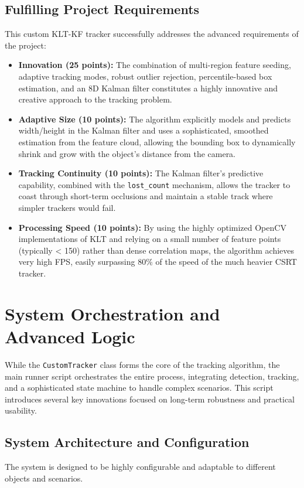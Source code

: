 \documentclass[12pt, a4paper]{article}
\begin{document}
\subsection{Fulfilling Project Requirements}
This custom KLT-KF tracker successfully addresses the advanced requirements of the project:
\begin{itemize}
    \item \textbf{Innovation (25 points):} The combination of multi-region feature seeding, adaptive tracking modes, robust outlier rejection, percentile-based box estimation, and an 8D Kalman filter constitutes a highly innovative and creative approach to the tracking problem.
    \item \textbf{Adaptive Size (10 points):} The algorithm explicitly models and predicts width/height in the Kalman filter and uses a sophisticated, smoothed estimation from the feature cloud, allowing the bounding box to dynamically shrink and grow with the object's distance from the camera.
    \item \textbf{Tracking Continuity (10 points):} The Kalman filter's predictive capability, combined with the \texttt{lost\_count} mechanism, allows the tracker to coast through short-term occlusions and maintain a stable track where simpler trackers would fail.
    \item \textbf{Processing Speed (10 points):} By using the highly optimized OpenCV implementations of KLT and relying on a small number of feature points (typically < 150) rather than dense correlation maps, the algorithm achieves very high FPS, easily surpassing 80\% of the speed of the much heavier CSRT tracker.
\end{itemize}

\section{System Orchestration and Advanced Logic}
While the \lstinline!CustomTracker! class forms the core of the tracking algorithm, the main runner script orchestrates the entire process, integrating detection, tracking, and a sophisticated state machine to handle complex scenarios. This script introduces several key innovations focused on long-term robustness and practical usability.

\subsection{System Architecture and Configuration}
The system is designed to be highly configurable and adaptable to different objects and scenarios.
\end{document}
